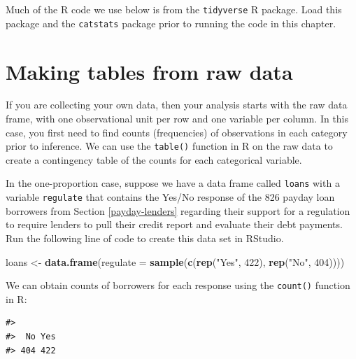\documentclass[
  10pt,
  openany]{book}
\newenvironment{Shaded}{\begin{snugshade}}{\end{snugshade}}
\newcommand{\AttributeTok}[1]{\textcolor[rgb]{0.13,0.29,0.53}{#1}}
\newcommand{\DecValTok}[1]{\textcolor[rgb]{0.00,0.00,0.81}{#1}}
\newcommand{\FunctionTok}[1]{\textcolor[rgb]{0.13,0.29,0.53}{\textbf{#1}}}
\newcommand{\NormalTok}[1]{#1}
\newcommand{\OtherTok}[1]{\textcolor[rgb]{0.56,0.35,0.01}{#1}}
\newcommand{\SpecialCharTok}[1]{\textcolor[rgb]{0.81,0.36,0.00}{\textbf{#1}}}
\newcommand{\StringTok}[1]{\textcolor[rgb]{0.31,0.60,0.02}{#1}}
\theoremstyle{definition}
\theoremstyle{definition}
\theoremstyle{definition}
\theoremstyle{definition}
\theoremstyle{remark}
\begin{document}
Much of the R code we use below is from the \texttt{tidyverse} R package. Load this package and the \texttt{catstats} package prior to running the code in this chapter.

\section*{Making tables from raw data}\label{making-tables-from-raw-data}

If you are collecting your own data, then your analysis starts with the raw data frame, with one observational unit per row and one variable per column. In this case, you first need to find counts (frequencies) of observations in each category prior to inference. We can use the \texttt{table()} function in R on the raw data to create a contingency table of the counts for each categorical variable.

In the one-proportion case, suppose we have a data frame called \texttt{loans} with a variable \texttt{regulate} that contains the Yes/No response of the 826 payday loan borrowers from Section \ref{payday-lenders} regarding their support for a regulation to require lenders to pull their credit report and evaluate their debt payments. Run the following line of code to create this data set in RStudio.

\begin{Shaded}
\begin{Highlighting}[]
\NormalTok{loans }\OtherTok{\textless{}{-}} \FunctionTok{data.frame}\NormalTok{(}\AttributeTok{regulate =} \FunctionTok{sample}\NormalTok{(}\FunctionTok{c}\NormalTok{(}\FunctionTok{rep}\NormalTok{(}\StringTok{"Yes"}\NormalTok{, }\DecValTok{422}\NormalTok{), }\FunctionTok{rep}\NormalTok{(}\StringTok{"No"}\NormalTok{, }\DecValTok{404}\NormalTok{))))}
\end{Highlighting}
\end{Shaded}

We can obtain counts of borrowers for each response using the \texttt{count()} function in R:

\begin{Shaded}
\end{Shaded}

\begin{verbatim}
#> 
#>  No Yes 
#> 404 422
\end{verbatim}
\end{document}

